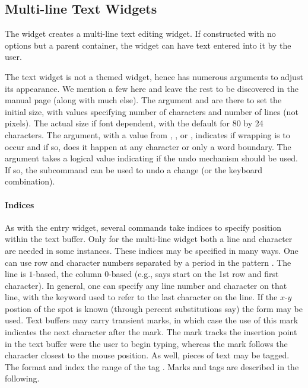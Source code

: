 \subsection{Multi-line Text Widgets}
\label{sec:tcltk:multi-line-text}

The  widget creates a multi-line text editing widget. If constructed with no options but a parent container, the widget can have text entered into it by the user. 

The text widget is not a themed widget, hence has numerous arguments to adjust its appearance. We mention a few here and leave the rest to be discovered in the manual page (along with much else). The argument  and  are there to set the initial size, with values specifying number of characters and number of lines (not pixels). The actual size if font dependent, with the default for 80 by 24 characters. The   argument, with a value from , , or , indicates if wrapping is to occur and if so, does it happen at any character or only a word boundary. The argument  takes a logical value indicating if the undo mechanism should be used. If so, the subcommand  can be used to undo a change (or the  keyboard combination).

\paragraph{Indices}
As with the entry widget, several commands take indices to specify
position within the text buffer. Only for the multi-line widget both a
line and character are needed in some instances. These indices may be
specified in many ways. One can use row and character numbers
separated by a period in the pattern . The line is
$1$-based, the column $0$-based (e.g.,  says start on the
1st row and first character). In general, one can specify any line
number and character on that line, with the keyword  used to
refer to the last character on the line. If the $x$-$y$ postion of the
spot is known (through percent substitutions say) the form
 may be used. Text buffers may carry transient marks, in
which case the use of this mark indicates the next character after the
mark. The mark  tracks the insertion point in the text
buffer were the user to begin typing, whereas the mark  follows the character closest to the mouse position. As well, pieces of text may be
tagged. The format  and  index the
range of the tag . Marks and tags are described in the
following.

